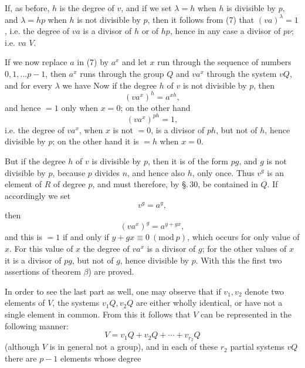 If, as before, $h$ is the degree of $v$, and if we set $\lambda = h$ when $h$ is divisible by $p$, and $\lambda = hp$ when $h$ is not divisible by $p$, then it follows from (7) that $(va)^\lambda = 1$, i.e. the degree of $va$ is a divisor of $h$ or of $hp$, hence in any case a divisor of $p\nu$; i.e. $va$  $V$.

If we now replace $a$ in (7) by $a^x$ and let $x$ run through the sequence of numbers $0, 1, \ldots p-1$, then $a^x$ runs through the group $Q$ and $va^x$ through the system $vQ$, and for every $\lambda$ we have
Now if the degree $h$ of $v$ is not divisible by $p$, then
\[
(va^x)^h = a^{xh},
\]
and hence $= 1$ only when $x = 0$; on the other hand
\[
(va^x)^{ph} = 1,
\]
i.e. the degree of $va^x$, when $x$ is not $= 0$, is a divisor of $ph$, but not of $h$, hence divisible by $p$; on the other hand it is $= h$ when $x = 0$.

But if the degree $h$ of $v$ is divisible by $p$, then it is of the form $pg$, and $g$ is not divisible by $p$, because $p$ divides $n$, and hence also $h$, only once. Thus $v^g$ is an element of $R$ of degree $p$, and must therefore, by \S.\,30, be contained in $Q$. If accordingly we set
\[
v^g = a^y,
\]
then
\[
(va^x)^g = a^{y+gx},
\]
and this is $= 1$ if and only if $y + gx \equiv 0 \ (\mathrm{mod}\ p)$, which occurs for only  value of $x$. For this value of $x$ the degree of $va^x$ is a divisor of $g$; for the other values of $x$ it is a divisor of $pg$, but not of $g$, hence divisible by $p$. With this the first two assertions of theorem $\beta$) are proved.

In order to see the last part as well, one may observe that if $v_1, v_2$ denote two elements of $V$, the systems $v_1 Q, v_2 Q$ are either wholly identical, or have not a single element in common. From this it follows that $V$ can be represented in the following manner:
\[
V = v_1 Q + v_2 Q + \cdots + v_{r_2} Q
\]
(although $V$ is in general not a group), and in each of these $r_2$ partial systems $vQ$ there are $p-1$ elements whose degree
